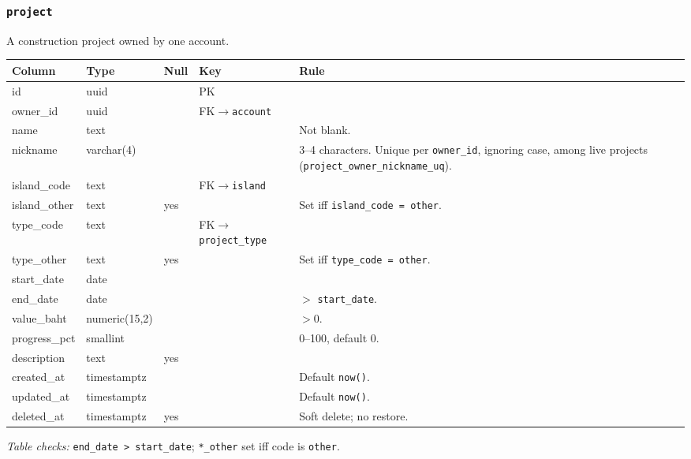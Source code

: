 \documentclass[11pt,a4paper]{article}
\begin{document}
\subsubsection*{\texttt{project}}
\noindent A construction project owned by one account.\par\vspace{2pt}
{\footnotesize\setlength{\tabcolsep}{4pt}\noindent\begin{tabularx}{\linewidth}{@{}>{\ttfamily\raggedright\arraybackslash}p{3.2cm} >{\ttfamily\raggedright\arraybackslash}p{3.15cm} >{\centering\arraybackslash}p{0.6cm} >{\raggedright\arraybackslash}p{3.85cm} Y@{}}
\toprule{}\normalfont Column & \normalfont Type & Null & Key & Rule \\ \midrule
id & uuid &  & PK &  \\
owner\_id & uuid &  & FK$\to$\texttt{account} &  \\
name & text &  &  & Not blank. \\
nickname & varchar(4) &  &  & 3--4 characters. Unique per \texttt{owner\_id}, ignoring case, among live projects (\texttt{project\_owner\_nickname\_uq}). \\
island\_code & text &  & FK$\to$\texttt{island} &  \\
island\_other & text & yes &  & Set iff \texttt{island\_code = other}. \\
type\_code & text &  & FK$\to$\texttt{project\_type} &  \\
type\_other & text & yes &  & Set iff \texttt{type\_code = other}. \\
start\_date & date &  &  &  \\
end\_date & date &  &  & $>$ \texttt{start\_date}. \\
value\_baht & numeric(15,2) &  &  & $> 0$. \\
progress\_pct & smallint &  &  & 0--100, default 0. \\
description & text & yes &  &  \\
created\_at & timestamptz &  &  & Default \texttt{now()}. \\
updated\_at & timestamptz &  &  & Default \texttt{now()}. \\
deleted\_at & timestamptz & yes &  & Soft delete; no restore. \\
\bottomrule\end{tabularx}}
{\footnotesize\noindent\textit{Table checks:} \texttt{end\_date > start\_date}; \texttt{*\_other} set iff code is \texttt{other}.\par}
\end{document}
